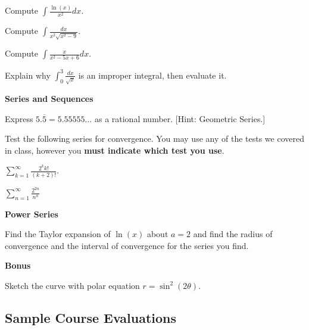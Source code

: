 \documentclass[teaching.portfolio.tex]{subfiles}
\begin{document}
\begin{thm}
  Compute $\displaystyle{\int \frac{\ln(x)}{x^2}dx}$.
\end{thm}

\begin{thm}
  Compute $\displaystyle{\int\frac{dx}{x^2\sqrt{x^2-9}}}$.
\end{thm}

\begin{thm}
  Compute $\displaystyle{\int\frac{x}{x^2 - 5x + 6}}dx$.
\end{thm}

\begin{thm}
  Explain why $\displaystyle{\int_0^3 \frac{dx}{\sqrt{x}}}$ is an improper integral, then evaluate it.
\end{thm}

\textbf{Series and Sequences}
\begin{thm}
  Express $5.\overline{5} = 5.55555\ldots$ as a rational number. [Hint: Geometric Series.]
\end{thm}

\noindent
Test the following series for convergence.
You may use any of the tests we covered in class, however you {\bf must indicate which test you use}.
\begin{thm}
  $\displaystyle{\sum_{k=1}^\infty \frac{2^k k!}{(k+2)!}}.$
\end{thm}

\begin{thm}
  $\displaystyle{\sum_{n=1}^\infty \frac{2^{2n}}{n^n}}$
\end{thm}

\textbf{Power Series}

\begin{thm}
  Find the Taylor expansion of $\ln(x)$ about $a = 2$ and find the radius of convergence and the interval of convergence for the series you find.
\end{thm}

\textbf{Bonus}

\begin{thm}
  Sketch the curve with polar equation $\displaystyle{r = \sin^2(2\theta)}$.
\end{thm}

\subsection{Sample Course Evaluations}




\end{document}
